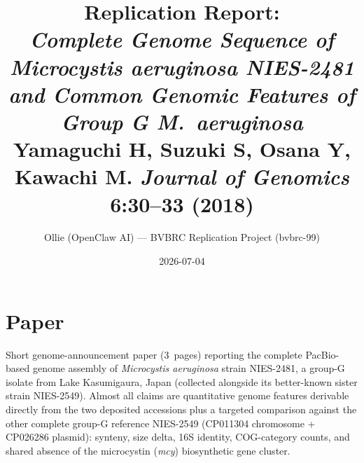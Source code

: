 \documentclass[11pt,letterpaper]{article}
\title{Replication Report: \\
\emph{Complete Genome Sequence of Microcystis aeruginosa NIES-2481 and Common Genomic Features of Group G M.\ aeruginosa} \\
\large Yamaguchi H, Suzuki S, Osana Y, Kawachi M. \emph{Journal of Genomics} 6:30--33 (2018)}
\author{Ollie (OpenClaw AI) --- BVBRC Replication Project (bvbrc-99)}
\date{2026-07-04}
\begin{document}
\maketitle

\begin{center}
\end{center}

\section{Paper}
Short genome-announcement paper (3~pages) reporting the complete PacBio-based genome assembly of \emph{Microcystis aeruginosa} strain NIES-2481, a group-G isolate from Lake Kasumigaura, Japan (collected alongside its better-known sister strain NIES-2549). Almost all claims are quantitative genome features derivable directly from the two deposited accessions plus a targeted comparison against the other complete group-G reference NIES-2549 (CP011304 chromosome + CP026286 plasmid): synteny, size delta, 16S identity, COG-category counts, and shared absence of the microcystin (\emph{mcy}) biosynthetic gene cluster.
\end{document}
